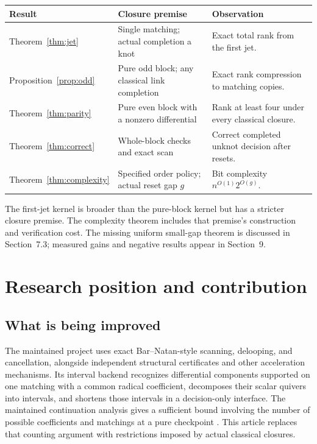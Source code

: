 \documentclass[11pt]{article}
\theoremstyle{definition}\newtheorem{definition}[theorem]{Definition}\newtheorem{example}[theorem]{Example}
\theoremstyle{remark}\newtheorem{remark}[theorem]{Remark}
\begin{document}
\begin{center}\small
\begin{tabularx}{\textwidth}{@{}p{}p{}X@{}}
\toprule
Result & Closure premise & Observation \\
\midrule
Theorem~\ref{thm:jet} & Single matching; actual completion a knot & Exact total rank from the first jet. \\
Proposition~\ref{prop:odd} & Pure odd block; any classical link completion & Exact rank compression to matching copies. \\
Theorem~\ref{thm:parity} & Pure even block with a nonzero differential & Rank at least four under every classical closure. \\
Theorem~\ref{thm:correct} & Whole-block checks and exact scan & Correct completed unknot decision after resets. \\
Theorem~\ref{thm:complexity} & Specified order policy; actual reset gap $g$ & Bit complexity $n^{O(1)}2^{O(g)}$. \\
\bottomrule
\end{tabularx}\end{center}
\noindent The first-jet kernel is broader than the pure-block kernel but has a stricter closure premise. The complexity theorem includes that premise's construction and verification cost. The missing uniform small-gap theorem is discussed in Section~7.3; measured gains and negative results appear in Section~9.
\newpage

\section{Research position and contribution}
\subsection{What is being improved}
The maintained project uses exact Bar--Natan-style scanning, delooping, and cancellation, alongside independent structural certificates and other acceleration mechanisms. Its interval backend recognizes differential components supported on one matching with a common radical coefficient, decomposes their scalar quivers into intervals, and shortens those intervals in a decision-only interface. The maintained continuation analysis gives a sufficient bound involving the number of possible coefficients and matchings at a pure checkpoint \cite{ProveIt}. This article replaces that counting argument with restrictions imposed by actual classical closures.
\end{document}
